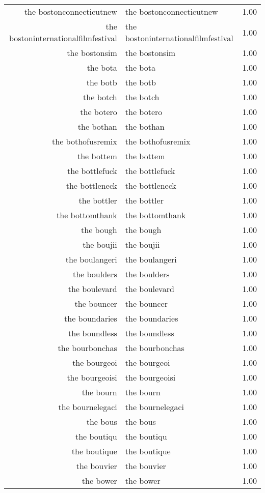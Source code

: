 \begin{table}[ht]
\begin{tabular}{rlr}
  the bostonconnecticutnew & the bostonconnecticutnew & 1.00 \\ 
  the bostoninternationalfilmfestival & the bostoninternationalfilmfestival & 1.00 \\ 
  the bostonsim & the bostonsim & 1.00 \\ 
  the bota & the bota & 1.00 \\ 
  the botb & the botb & 1.00 \\ 
  the botch & the botch & 1.00 \\ 
  the botero & the botero & 1.00 \\ 
  the bothan & the bothan & 1.00 \\ 
  the bothofusremix & the bothofusremix & 1.00 \\ 
  the bottem & the bottem & 1.00 \\ 
  the bottlefuck & the bottlefuck & 1.00 \\ 
  the bottleneck & the bottleneck & 1.00 \\ 
  the bottler & the bottler & 1.00 \\ 
  the bottomthank & the bottomthank & 1.00 \\ 
  the bough & the bough & 1.00 \\ 
  the boujii & the boujii & 1.00 \\ 
  the boulangeri & the boulangeri & 1.00 \\ 
  the boulders & the boulders & 1.00 \\ 
  the boulevard & the boulevard & 1.00 \\ 
  the bouncer & the bouncer & 1.00 \\ 
  the boundaries & the boundaries & 1.00 \\ 
  the boundless & the boundless & 1.00 \\ 
  the bourbonchas & the bourbonchas & 1.00 \\ 
  the bourgeoi & the bourgeoi & 1.00 \\ 
  the bourgeoisi & the bourgeoisi & 1.00 \\ 
  the bourn & the bourn & 1.00 \\ 
  the bournelegaci & the bournelegaci & 1.00 \\ 
  the bous & the bous & 1.00 \\ 
  the boutiqu & the boutiqu & 1.00 \\ 
  the boutique & the boutique & 1.00 \\ 
  the bouvier & the bouvier & 1.00 \\ 
  the bower & the bower & 1.00 \\ 

\end{tabular}
\end{table}
